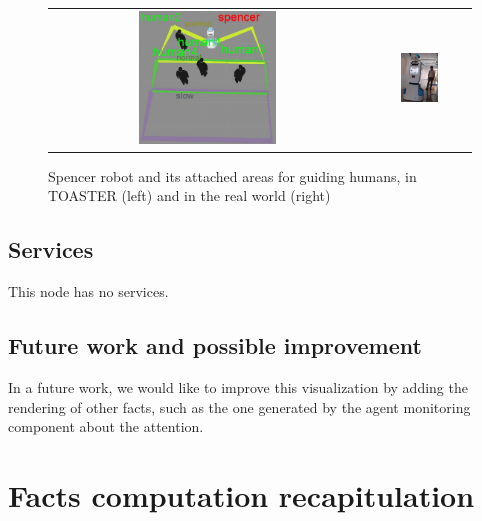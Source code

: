 \documentclass[a4paper]{article}
\begin{document}
 \begin{figure}[ht!]
 \centering
 \begin{tabular}{cc}
  \includegraphics[width=0.45\textwidth]{img/toaster_spencer.jpg} &
  \includegraphics[width=0.4\textwidth]{img/spencer_guidingShrink.png}
 \end{tabular}
 \caption{Spencer robot and its attached areas for guiding humans, in TOASTER (left) and in the real world (right)}
 \label{fig:spencer}
 \end{figure}
\subsection{Services}
This node has no services.

\subsection{Future work and possible improvement}
In a future work, we would like to improve this visualization by adding the rendering of other facts, such as the one generated by the agent monitoring component about the attention.


\section{Facts computation recapitulation}
\end{document}
